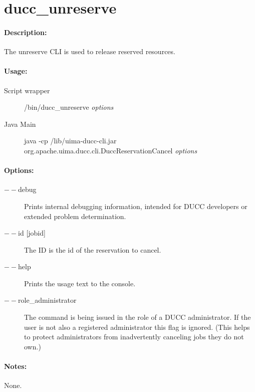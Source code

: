 \ifpdf
\else
{}
\fi
    \section{ducc\_unreserve}
    \label{sec:cli.unreserve}

    \paragraph{Description:}
    The unreserve CLI is used to release reserved resources. 

    \paragraph{Usage:}
    \begin{description}
    \item[Script wrapper] \ducchome/bin/ducc\_unreserve {\em options}
    \item[Java Main]      java -cp \ducchome/lib/uima-ducc-cli.jar org.apache.uima.ducc.cli.DuccReservationCancel {\em options}
    \end{description}

    \paragraph{Options:}
    \begin{description}
        \item[$--$debug ]          
          Prints internal debugging information, intended for DUCC developers or extended problem determination.
        \item[$--$id {[jobid]}]
          The ID is the id of the reservation to cancel.
        \item[$--$help]
          Prints the usage text to the console. 
        \item[$--$role\_administrator] The command is being issued in the role of a DUCC administrator.
          If the user is not also a registered administrator this flag is ignored.  (This helps to
          protect administrators from inadvertently canceling jobs they do not own.)          
     \end{description}
        
    \paragraph{Notes:}
    None.

